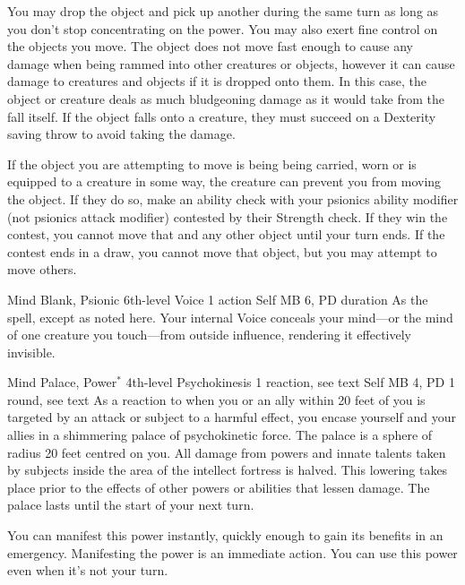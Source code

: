   You may drop the object and pick up another during
  the same turn as long as you don't stop concentrating
  on the power.
  You may also exert fine control on the objects you move.
  The object does not move fast enough to cause any damage
  when being rammed into other creatures or objects,
  however it can cause damage to creatures and objects
  if it is dropped onto them.
  In this case, the object or creature deals as much
  bludgeoning damage as it would take from the fall itself.
  If the object falls onto a creature,
  they must succeed on a Dexterity saving throw
  to avoid taking the damage.

  If the object you are attempting to move is being being carried, worn
  or is equipped to a creature in some way,
  the creature can prevent you from moving the object.
  If they do so, make an ability check with your
  psionics ability modifier (not psionics attack modifier)
  contested by their Strength check.
  If they win the contest, you cannot move that and
  any other object until your turn ends.
  If the contest ends in a draw, you cannot move
  that object, but you may attempt to move others.
  
\DndPowerHeader%
  {Mind Blank, Psionic}
  {6th-level Voice}
  {1 action}
  {Self}
  {MB 6, PD \lvlsix}
  {duration}
As the  spell, except as noted here.
Your internal Voice conceals your mind---or
the mind of one creature you touch---from
outside influence,
rendering it effectively invisible. 

\DndPowerHeader%
  {Mind Palace, Power$^*$}
  {4th-level Psychokinesis}
  {1 reaction, see text}
  {Self}
  {MB 4, PD \lvlfour}
  {1 round, see text}
  As a reaction to when you or an ally within 20 feet of you
  is targeted by an attack or subject to a harmful effect,
  you encase yourself and your allies in a
  shimmering palace of psychokinetic force.
  The palace is a sphere of radius 20 feet centred on you. 
  All damage from powers and innate talents
  taken by subjects inside the area of the intellect fortress
  is halved.
  This lowering takes place prior to the effects
  of other powers or abilities that lessen damage.
  The palace lasts until the start of your next turn.
  
  You can manifest this power instantly,
  quickly enough to gain its benefits in an emergency.
  Manifesting the power is an immediate action.
  You can use this power even when it's not your turn.

